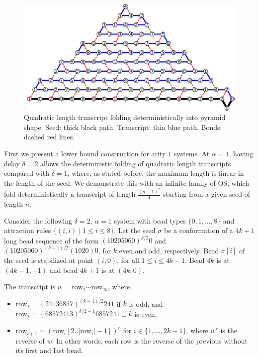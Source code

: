 \begin{figure}
	\centering
	\includegraphics[width=\linewidth]{./Fig/CI_NumbersNew}
	\caption{Quadratic length transcript folding deterministically into pyramid shape. Seed: thick black path. Transcript: thin blue path. Bonds: dashed red lines. }
	\label{CI:big}
\end{figure}

First we present a lower bound construction for arity $1$ systems. At $\alpha=1$, having delay $\delta=2$ allows the deterministic folding of quadratic length transcripts compared with $\delta=1$, where, as stated before, the maximum length is linear in the length of the seed. We demonstrate this with an infinite family of OS, which fold deterministically a transcript of length $\frac{(n-1)^2}{4}$ starting from a given seed of length $n$.



Consider the following $\delta=2$, $\alpha=1$ system with bead types $\{0,1,\dots,8\}$ and attraction rules $\{(i,i) \mid 1\leq i\leq 8\}$. Let the seed $\sigma$ be a conformation of a $4k+1$ long bead sequence of the form $(10205060)^{k/2}0$ and $(10205060)^{(k-1)/2}(1020)0$, for $k$ even and odd, respectively. Bead $\sigma[i]$ of the seed is stabilized at point $(i,0)$, for all $1\leq i\leq 4k-1$. Bead $4k$ is at $(4k-1,-1)$ and bead $4k+1$ is at $(4k,0)$.
\vspace{0.1cm}

The transcript is $w=\mathrm{row}_1\cdots \mathrm{row}_{2k}$, where 
\begin{itemize}
	\item $\mathrm{row}_1=(24136857)^{(k-1)/2}241$ if $k$ is odd, and $\mathrm{row}_1=(68572413)^{k/2-1}6857241$ if $k$ is even;
	\item $\mathrm{row}_{i+1}=(\mathrm{row}_i[2..|\mathrm{row}_i|-1])^r$ for $i\in \{1,\dots, 2k-1\}$, where $w^r$ is the reverse of $w$. In other words, each row is the reverse of the previous without its first and last bead.
\end{itemize}


